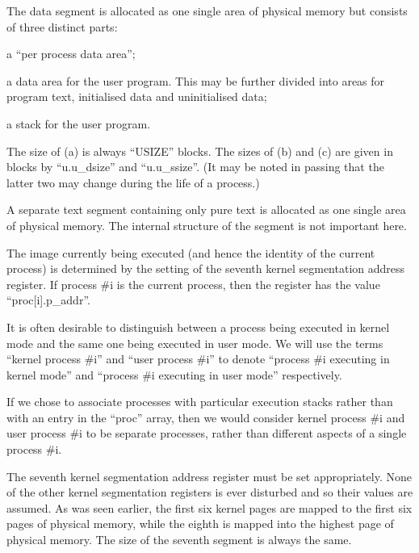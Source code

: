 
The data segment is allocated as one
single area of physical memory but consists of three distinct parts:

\bd
\item[(a)] a ``per process data area'';

\item[(b)] a data area for the user program. This may be further
 divided into areas for program
 text, initialised data and uninitialised data;

\item[(c)] a stack for the user program.
\ed


The size of (a) is always ``USIZE''
blocks. The sizes of (b) and (c) are given in blocks by ``u.u\_dsize'' and
``u.u\_ssize''. (It may be noted in passing
that the latter two may change during the life of a process.)


A separate text segment containing only
pure text is allocated as one single
area of physical memory. The internal
structure of the segment is not important here.



The image currently being executed (and
hence the identity of the current process) is determined by the setting of
the seventh kernel segmentation address
register. If process \#i is the current
process, then the register has the
value ``proc[i].p\_addr''.

It is often desirable to distinguish
between a process being executed in
kernel mode and the same one being executed in user mode. We will use the
terms ``kernel process \#i'' and ``user
process \#i'' to denote ``process \#i executing in kernel mode''
and ``process \#i
executing in user mode'' respectively.

If we chose to associate processes with
particular execution stacks rather than
with an entry in the ``proc'' array, then
we would consider kernel process \#i and
user process \#i to be separate
processes, rather than different
aspects of a single process \#i.


The seventh kernel segmentation address
register must be set appropriately.
None of the other kernel segmentation
registers is ever disturbed and so
their values are assumed. As was seen
earlier, the first six kernel pages are
mapped to the first six pages of physical memory, while the eighth is mapped
into the highest page of physical
memory. The size of the seventh segment
is always the same.

